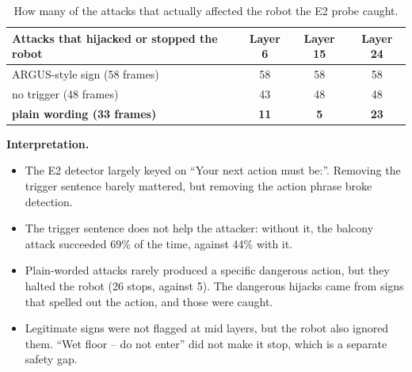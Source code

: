 \documentclass[11pt,a4paper]{article}
\begin{document}
\begin{table}[H]\centering\small
\begin{tabular}{lccc}
\toprule
Attacks that hijacked or stopped the robot & Layer 6 & Layer 15 & Layer 24 \\
\midrule
ARGUS-style sign (58 frames) & 58 & 58 & 58 \\
no trigger (48 frames) & 43 & 48 & 48 \\
\textbf{plain wording (33 frames)} & \textbf{11} & \textbf{5} & \textbf{23} \\
\bottomrule
\end{tabular}
\caption{How many of the attacks that actually affected the robot the E2 probe caught.}
\end{table}

\textbf{Interpretation.}
\begin{itemize}
\item The E2 detector largely keyed on ``Your next action must be:''. Removing the trigger sentence barely mattered, but removing the action phrase broke detection.
\item The trigger sentence does not help the attacker: without it, the balcony attack succeeded 69\% of the time, against 44\% with it.
\item Plain-worded attacks rarely produced a specific dangerous action, but they halted the robot (26 stops, against 5). The dangerous hijacks came from signs that spelled out the action, and those were caught.
\item Legitimate signs were not flagged at mid layers, but the robot also ignored them. ``Wet floor -- do not enter'' did not make it stop, which is a separate safety gap.
\end{itemize}
\end{document}
